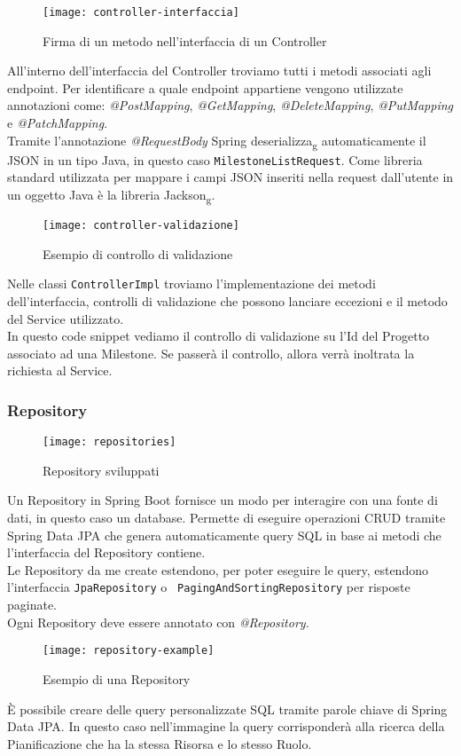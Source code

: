 \begin{figure}[H] 
    \centering 
    \texttt{[image: controller-interfaccia]} 
    \caption{Firma di un metodo nell'interfaccia di un Controller}
\end{figure}
\noindent All'interno dell'interfaccia del Controller troviamo tutti i metodi associati agli endpoint. Per identificare a quale endpoint appartiene vengono utilizzate annotazioni come: \textit{@PostMapping}, \textit{@GetMapping}, \textit{@DeleteMapping}, \textit{@PutMapping} e \textit{@PatchMapping}.\\
Tramite l'annotazione \textit{@RequestBody} Spring deserializza\textsubscript{g} automaticamente il JSON in un tipo Java, in questo caso \texttt{MilestoneListRequest}.
Come libreria standard utilizzata per mappare i campi JSON inseriti nella request dall'utente in un oggetto Java è la libreria Jackson\textsubscript{g}.

\begin{figure}[H] 
    \centering 
    \texttt{[image: controller-validazione]} 
    \caption{Esempio di controllo di validazione}
\end{figure}
\noindent Nelle classi \texttt{ControllerImpl} troviamo l'implementazione dei metodi dell'interfaccia, controlli di validazione che possono lanciare eccezioni e il metodo del Service utilizzato.\\
In questo code snippet vediamo il controllo di validazione su l'Id del Progetto associato ad una Milestone. Se passerà il controllo, allora verrà inoltrata la richiesta al Service.

\subsubsection{Repository}
\begin{figure}[H] 
    \centering 
    \texttt{[image: repositories]} 
    \caption{Repository sviluppati}
\end{figure}
Un Repository in Spring Boot fornisce un modo per interagire con una fonte di dati, in questo caso un database. Permette di eseguire operazioni CRUD tramite Spring Data JPA che genera automaticamente query SQL in base ai metodi che l'interfaccia del Repository contiene.\\
Le Repository da me create estendono, per poter eseguire le query, estendono l'interfaccia \texttt{JpaRepository} o \texttt{ PagingAndSortingRepository} per risposte paginate.\\
Ogni Repository deve essere annotato con \textit{@Repository}. 
\begin{figure}[H] 
    \centering 
    \texttt{[image: repository-example]} 
    \caption{Esempio di una Repository}
\end{figure}
\noindent È possibile creare delle query personalizzate SQL tramite parole chiave di Spring Data JPA. In questo caso nell'immagine la query corrisponderà alla ricerca della Pianificazione che ha la stessa Risorsa e lo stesso Ruolo.

